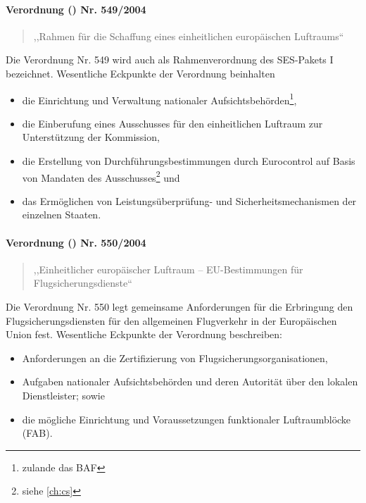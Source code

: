 \pagebreak

\paragraph{Verordnung () Nr. 549/2004} \label{er_549}

    \begin{quote}
        ,,Rahmen für die Schaffung eines einheitlichen europäischen Luftraums``\\
        \cite{2004R0549, 2004R0549_summary}
    \end{quote}

    \noindent
    Die Verordnung Nr. 549 wird auch als Rahmenverordnung des \ac{SES}-Pakets I bezeichnet.
    Wesentliche Eckpunkte der Verordnung beinhalten
    
    \begin{itemize}
        \item die Einrichtung und Verwaltung nationaler Aufsichtsbehörden\footnote{zulande das \acf{BAF}},
        \item die Einberufung eines Ausschusses für den einheitlichen Luftraum zur Unterstützung der Kommission,
        \item die Erstellung von Durchführungsbestimmungen durch Eurocontrol auf Basis von Mandaten des Ausschusses\footnote{siehe \ref{ch:cs}} und
        \item das Ermöglichen von Leistungsüberprüfung- und Sicherheitsmechanismen der einzelnen Staaten. \cite{2004R0549_summary}
    \end{itemize}
        
\paragraph{Verordnung () Nr. 550/2004} \label{er_550}
    \begin{quote}
        ,,Einheitlicher europäischer Luftraum – EU-Bestimmungen für Flugsicherungsdienste`` 
        \cite{2004R0550, 2004R0550_summary}
    \end{quote}

    \noindent
    Die Verordnung Nr. 550 legt gemeinsame Anforderungen für die Erbringung den Flugsicherungsdiensten für den allgemeinen Flugverkehr in der Europäischen Union fest. 
    Wesentliche Eckpunkte der Verordnung beschreiben:
    
    \begin{itemize}
        \item Anforderungen an die Zertifizierung von Flugsicherungsorganisationen,
        \item Aufgaben nationaler Aufsichtsbehörden und deren Autorität über den lokalen Dienstleister; sowie
        \item die mögliche Einrichtung und Voraussetzungen funktionaler Luftraumblöcke (\acs{FAB}). \cite{2004R0550_summary}
    \end{itemize}

